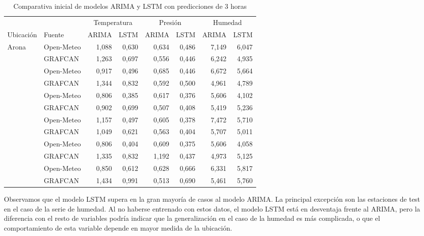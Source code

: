 \begin{table}[ht]
\centering
\begin{tabular}{llrrrrrr}
\toprule
 &  & \multicolumn{2}{c}{Temperatura} & \multicolumn{2}{c}{Presión} & \multicolumn{2}{c}{Humedad} \\
\cmidrule(lr){3-4} \cmidrule(lr){5-6} \cmidrule(lr){7-8}
Ubicación & Fuente & ARIMA & LSTM & ARIMA & LSTM & ARIMA & LSTM \\
\midrule
\multirow{2}{*}{Arona}
  & Open-Meteo    & 1,088 & 0,630 & 0,634 & 0,486 & 7,149 & 6,047 \\
  & GRAFCAN       & 1,263 & 0,697 & 0,556 & 0,446 & 6,242 & 4,935 \\
\addlinespace
\multirow{2}{*}{La Orotava}
  & Open-Meteo    & 0,917 & 0,496 & 0,685 & 0,446 & 6,672 & 5,664 \\
  & GRAFCAN       & 1,344 & 0,832 & 0,592 & 0,500 & 4,961 & 4,789 \\
\addlinespace
\multirow{2}{*}{La Laguna 1}
  & Open-Meteo    & 0,806 & 0,385 & 0,617 & 0,376 & 5,606 & 4,102 \\
  & GRAFCAN       & 0,902 & 0,699 & 0,507 & 0,408 & 5,419 & 5,236 \\
\addlinespace
\multirow{2}{*}{La Laguna 2}
  & Open-Meteo    & 1,157 & 0,497 & 0,605 & 0,378 & 7,472 & 5,710 \\
  & GRAFCAN       & 1,049 & 0,621 & 0,563 & 0,404 & 5,707 & 5,011 \\
\addlinespace
\multirow{2}{*}{Santa Cruz}
  & Open-Meteo    & 0,806 & 0,404 & 0,609 & 0,375 & 5,606 & 4,058 \\
  & GRAFCAN       & 1,335 & 0,832 & 1,192 & 0,437 & 4,973 & 5,125 \\
\addlinespace
\multirow{2}{*}{Garachico}
  & Open-Meteo    & 0,850 & 0,612 & 0,628 & 0,666 & 6,331 & 5,817 \\
  & GRAFCAN       & 1,434 & 0,991 & 0,513 & 0,690 & 5,461 & 5,760 \\
\bottomrule
\end{tabular}
\caption{Comparativa inicial de modelos ARIMA y LSTM con predicciones de 3 horas} 
\label{comparativa_inicial}
\end{table}

Observamos que el modelo LSTM supera en la gran mayoría de casos al modelo ARIMA. La principal excepción son las estaciones de test en el caso de la serie de humedad.
Al no haberse entrenado con estos datos, el modelo LSTM está en desventaja frente al ARIMA, pero la diferencia con el resto de variables podría indicar que la generalización en el caso de la humedad 
es más complicada, o que el comportamiento de esta variable depende en mayor medida de la ubicación. 

